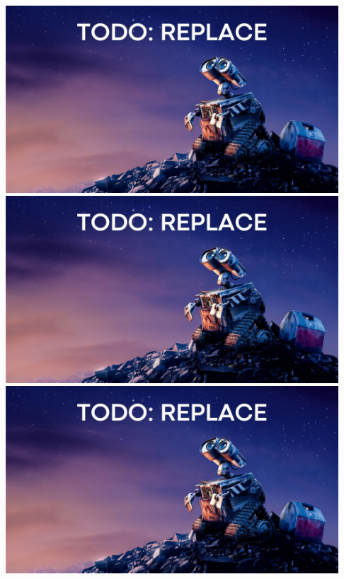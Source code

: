 \documentclass[11pt]{article}
\begin{document}
\begin{tcolorbox}[colback=white!5!white,colframe=green!75!black]
\includegraphics[width=1\textwidth,height=7cm,keepaspectratio]{images/TODO wall-e.jpg}
\includegraphics[width=1\textwidth,height=7cm,keepaspectratio]{images/TODO wall-e.jpg}
\includegraphics[width=1\textwidth,height=7cm,keepaspectratio]{images/TODO wall-e.jpg}
\end{tcolorbox}


\end{document}

